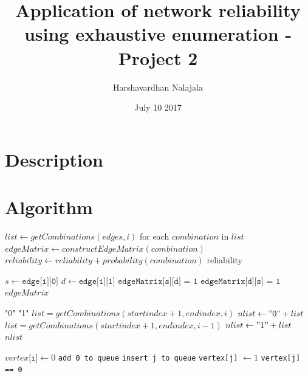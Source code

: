 \documentclass[11pt]{article}
\title{Application of network reliability using exhaustive enumeration - Project 2}
\author{Harshavardhan Nalajala}
\date{July 10 2017}
\begin{document}
\maketitle
 \tableofcontents
 \section{Description}
 
 \section{Algorithm}
\begin{algorithm}
\label{euclid}
\begin{algorithmic}[1]
\State $list \gets getCombinations(edges, i)$
\State for each $combination$ in $list$
\State $edgeMatrix \gets constructEdgeMatrix(combination)$
\State $reliability \gets reliability + probability(combination)$
\EndIf
\EndFor
\Return reliability
\EndProcedure
\end{algorithmic}
\begin{algorithmic}[1]
\State $s \gets \texttt{edge[i][0]}$
\State $d \gets \texttt{edge[i][1]}$
\State $\texttt{edgeMatrix[s][d] = 1}$
\State $\texttt{edgeMatrix[d][s] = 1}$
\EndIf
\EndFor
\Return $edgeMatrix$
\EndProcedure
\end{algorithmic}
\begin{algorithmic}[1]
\Return "0"
\EndIf
\Return "1"
\EndIf
\State $list = getCombinations(startindex+1, endindex, i)$
\State $nlist \gets "0" + list$
\EndFor
\State $list = getCombinations(startindex+1, endindex, i-1)$
\State $nlist \gets "1" + list$
\EndFor
\Return $nlist$
\EndProcedure
\end{algorithmic}
\begin{algorithmic}[1]
\State $vertex\texttt{[i]} \gets 0$
\EndFor
\State \texttt{add 0 to queue}
\State \texttt{insert j to queue}
\State \texttt{vertex[j]} $\gets 1$
\EndIf
\EndFor
\EndWhile
{}
\If \texttt{vertex[j] == 0}
\EndIf
\EndFor
{}
\EndProcedure
\end{algorithmic}
\end{algorithm} 
\end{document}
